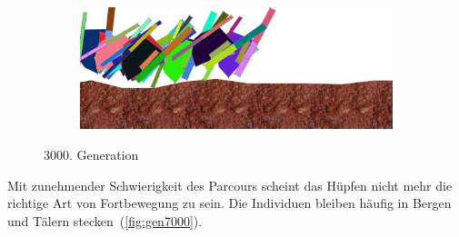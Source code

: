\begin{figure}[H]
\begin{subfigure}[b]{0.45\textwidth}
              \includegraphics[width=\linewidth,center]{graphics/simulation-results/4_gen3000_4}
              \caption{\label{fig:gen3000_4}}
            \end{subfigure}
            \caption{3000. Generation \label{fig:gen3000}}
          \end{figure}

          Mit zunehmender Schwierigkeit des Parcours scheint das Hüpfen nicht mehr die richtige Art von Fortbewegung zu sein.
          Die Individuen bleiben häufig in Bergen und Tälern stecken~(\vref{fig:gen7000}).

